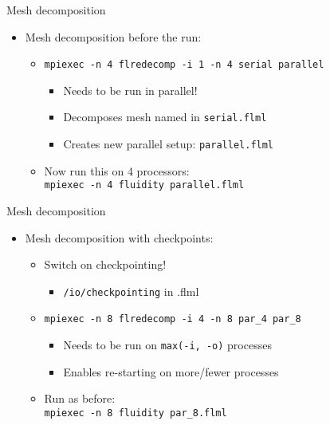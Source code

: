 \documentclass[t, hyperref={pdfpagelabels=false}]{beamer}
\begin{document}
\begin{frame}{Mesh decomposition}
  \begin{itemize}
  \item[] Mesh decomposition before the run:
    \begin{itemize}

      \vspace{1em}
    \item \lstinline+mpiexec -n 4 flredecomp -i 1 -n 4 serial parallel+
      \begin{itemize}
      \item Needs to be run in parallel!
      \item Decomposes mesh named in \lstinline+serial.flml+
      \item Creates new parallel setup: \lstinline+parallel.flml+
      \end{itemize}

      \vspace{1em}
    \item Now run this on 4 processors: \\
      \lstinline+mpiexec -n 4 fluidity parallel.flml+
    \end{itemize}
  \end{itemize}
\end{frame}

\begin{frame}{Mesh decomposition}
  \begin{itemize}
  \item[] Mesh decomposition with checkpoints:
    \begin{itemize}
      \vspace{1em}
    \item Switch on checkpointing!
      \begin{itemize}
      \item \lstinline+/io/checkpointing+ in .flml
      \end{itemize}

      \vspace{1em}
    \item \lstinline+mpiexec -n 8 flredecomp -i 4 -n 8 par_4 par_8+
      \begin{itemize}
      \item Needs to be run on \lstinline+max(-i, -o)+ processes
      \item Enables re-starting on more/fewer processes
      \end{itemize}

      \vspace{1em}
    \item Run as before: \\
      \lstinline+mpiexec -n 8 fluidity par_8.flml+
    \end{itemize}
  \end{itemize}
\end{frame}
\end{document}
